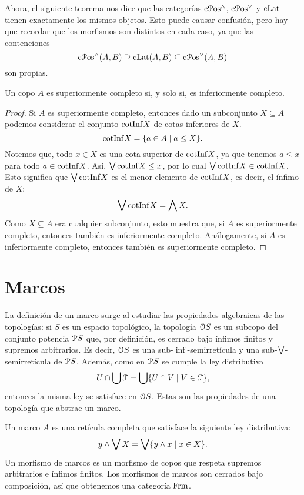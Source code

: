 Ahora, el siguiente teorema nos dice que las categorías $\InfLat$,
$\SupLat$ y $\CLat$ tienen exactamente los mismos objetos.
Esto puede causar confusión, pero hay que recordar que los morfismos
son distintos en cada caso, ya que las contenciones
\[
  \InfLat(A,B)\supseteq \CLat(A,B)\subseteq\SupLat(A,B)
\]
son propias.
\begin{proposition}
  Un copo $A$ es superiormente completo si, y solo si, es
  inferiormente completo.
\end{proposition}
\begin{proof}
  Si $A$ es superiormente completo, entonces
  dado un subconjunto $X\subseteq A$ podemos considerar el conjunto
  $\cotInf X$ de cotas inferiores de $X$.
  \[
    \cotInf X = \{a\in A \mid a\leq X\}
  .\]
  Notemos que, todo $x\in X$ es una cota superior de $\cotInf X$,
  ya que tenemos $a\leq x$ para todo $a\in\cotInf X$.
  Así, $\Sup\cotInf X\leq x$, por lo cual
  $\Sup\cotInf X\in\cotInf X$.
  Esto significa que $\Sup\cotInf X$ es el menor elemento de $\cotInf
  X$, es decir, el ínfimo de $X$:
  \[
    \Sup\cotInf X = \Inf X
  .\]
  Como $X\subseteq A$ era cualquier subconjunto,
  esto muestra que, si $A$ es superiormente completo, entonces
  también es inferiormente completo.
  Análogamente, si $A$ es inferiormente completo, entonces también
  es superiormente completo.
\end{proof}



\section{Marcos}\label{frm}
La definición de un marco surge al estudiar las propiedades
algebraicas de las topologías:
si $S$ es un espacio topológico, la topología $\cal OS$ es
un subcopo del conjunto potencia $\cal PS$ que,
por definición, es cerrado bajo ínfimos finitos y
supremos arbitrarios. Es decir, $\cal OS$ es una
sub-$\inf$-semirretícula y una sub-$\Sup$-semirretícula de $\cal
PS$.
Además, como en $\cal PS$ se cumple la ley distributiva
\begin{equation}
  U\cap\bigcup \cal F=\bigcup\{U\cap V\mid V\in\cal F\},
\end{equation}
entonces la misma ley se satisface en $\cal OS$.
Estas son las propiedades de una topología que abstrae un marco.

\begin{definition}
  Un marco $A$ es una retícula completa que satisface la siguiente
  ley distributiva:
  \[
      y\inf\Sup X = \Sup\{y\inf x\mid x\in X\}
  .\]
  Un morfismo de marcos es un morfismo de copos que respeta
  supremos arbitrarios e ínfimos finitos.
  Los morfismos de marcos son cerrados
  bajo composición, así que obtenemos una categoría $\Frm$.
\end{definition}

